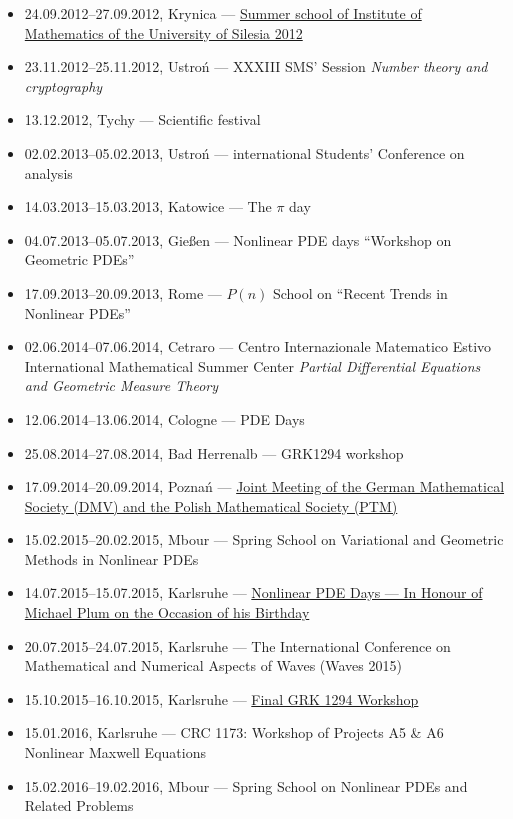 \begin{itemize}
  \item 24.09.2012--27.09.2012, Krynica --- \href{http://www.math.us.edu.pl/lsim2012/index.html}{Summer school of Institute of Mathematics of the University of Silesia 2012}
  \item 23.11.2012--25.11.2012, Ustroń --- XXXIII SMS' Session \textsl{Number theory and cryptography}
  \item 13.12.2012, Tychy --- Scientific festival
  \item 02.02.2013--05.02.2013, Ustroń ---  international Students' Conference on analysis
  \item 14.03.2013--15.03.2013, Katowice --- The $\pi$ day
  \item 04.07.2013--05.07.2013, Gießen --- Nonlinear PDE days ``Workshop on Geometric PDEs''
  \item 17.09.2013--20.09.2013, Rome --- $P(n)$ School on ``Recent Trends in Nonlinear PDEs''
  \item 02.06.2014--07.06.2014, Cetraro ---  Centro Internazionale Matematico Estivo International Mathematical Summer Center \textit{Partial Differential Equations and Geometric Measure Theory}
  \item 12.06.2014--13.06.2014, Cologne --- PDE Days
  \item 25.08.2014--27.08.2014, Bad Herrenalb --- GRK1294 workshop
  \item 17.09.2014--20.09.2014, Poznań --- \href{http://ptm-dmv.wmi.amu.edu.pl/}{Joint Meeting of the German Mathematical Society (DMV) and the Polish Mathematical Society (PTM)}
  \item 15.02.2015--20.02.2015, Mbour --- Spring School on Variational and Geometric Methods in Nonlinear PDEs
  \item 14.07.2015--15.07.2015, Karlsruhe --- \href{https://www.math.kit.edu/iana2/event/nonl. pde days/en}{Nonlinear PDE Days --- In Honour of Michael Plum on the Occasion of his  Birthday}
  \item 20.07.2015--24.07.2015, Karlsruhe --- The  International Conference on Mathematical and Numerical Aspects of Waves (Waves 2015)
  \item 15.10.2015--16.10.2015, Karlsruhe --- \href{https://www.math.kit.edu/grk1294/page/finalws/}{Final GRK 1294 Workshop}
  \item 15.01.2016, Karlsruhe --- CRC 1173: Workshop of Projects A5 \& A6 Nonlinear Maxwell Equations
  \item 15.02.2016--19.02.2016, Mbour --- Spring School on Nonlinear PDEs and Related Problems

\end{itemize}
